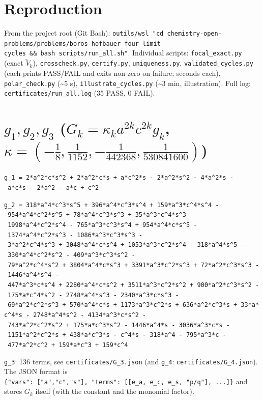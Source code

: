 \documentclass[11pt,a4paper]{report}
\begin{document}
\section{Reproduction}

From the project root (Git Bash): \texttt{outils/wsl\ "cd\ chemistry-open-problems/problems/boros-hofbauer-four-limit-cycles\ \&\&\ bash\ scripts/run\_all.sh"}.
Individual scripts: \texttt{focal\_exact.py} (exact \(\tilde V_k\)), \texttt{crosscheck.py}, \texttt{certify.py}, \texttt{uniqueness.py},
\texttt{validated\_cycles.py} (each prints PASS/FAIL and exits non-zero on failure; seconds each), \texttt{polar\_check.py}
(\textasciitilde5 s), \texttt{illustrate\_cycles.py} (\textasciitilde3 min, illustration). Full log: \texttt{certificates/run\_all.log} (35 PASS, 0 FAIL).

\section{\texorpdfstring{\(g_1,g_2,g_3\) (\(G_k=\kappa_k a^{2k}c^{2k}g_k\), \(\kappa=(-\frac18,\frac1{1152},-\frac1{442368},\frac1{530841600})\))}{g\_1,g\_2,g\_3 (G\_k=\textbackslash kappa\_k a\^{}\{2k\}c\^{}\{2k\}g\_k, \textbackslash kappa=(-\textbackslash frac18,\textbackslash frac1\{1152\},-\textbackslash frac1\{442368\},\textbackslash frac1\{530841600\}))}}

\texttt{g\_1\ =\ 2*a\^{}2*c*s\^{}2\ +\ 2*a\^{}2*c*s\ +\ a*c\^{}2*s\ -\ 2*a\^{}2*s\^{}2\ -\ 4*a\^{}2*s\ -\ a*c*s\ -\ 2*a\^{}2\ -\ a*c\ +\ c\^{}2}

\texttt{g\_2\ =\ 318*a\^{}4*c\^{}3*s\^{}5\ +\ 396*a\^{}4*c\^{}3*s\^{}4\ +\ 159*a\^{}3*c\^{}4*s\^{}4\ -\ 954*a\^{}4*c\^{}2*s\^{}5\ +\ 78*a\^{}4*c\^{}3*s\^{}3\ +\ 35*a\^{}3*c\^{}4*s\^{}3\ -\ 1998*a\^{}4*c\^{}2*s\^{}4\ -\ 765*a\^{}3*c\^{}3*s\^{}4\ +\ 954*a\^{}4*c*s\^{}5\ -\ 1374*a\^{}4*c\^{}2*s\^{}3\ -\ 1086*a\^{}3*c\^{}3*s\^{}3\ -\ 3*a\^{}2*c\^{}4*s\^{}3\ +\ 3048*a\^{}4*c*s\^{}4\ +\ 1053*a\^{}3*c\^{}2*s\^{}4\ -\ 318*a\^{}4*s\^{}5\ -\ 330*a\^{}4*c\^{}2*s\^{}2\ -\ 409*a\^{}3*c\^{}3*s\^{}2\ -\ 79*a\^{}2*c\^{}4*s\^{}2\ +\ 3804*a\^{}4*c*s\^{}3\ +\ 3391*a\^{}3*c\^{}2*s\^{}3\ +\ 72*a\^{}2*c\^{}3*s\^{}3\ -\ 1446*a\^{}4*s\^{}4\ -\ 447*a\^{}3*c*s\^{}4\ +\ 2280*a\^{}4*c*s\^{}2\ +\ 3511*a\^{}3*c\^{}2*s\^{}2\ +\ 900*a\^{}2*c\^{}3*s\^{}2\ -\ 175*a*c\^{}4*s\^{}2\ -\ 2748*a\^{}4*s\^{}3\ -\ 2340*a\^{}3*c*s\^{}3\ -\ 69*a\^{}2*c\^{}2*s\^{}3\ +\ 570*a\^{}4*c*s\ +\ 1173*a\^{}3*c\^{}2*s\ +\ 636*a\^{}2*c\^{}3*s\ +\ 33*a*c\^{}4*s\ -\ 2748*a\^{}4*s\^{}2\ -\ 4134*a\^{}3*c*s\^{}2\ -\ 743*a\^{}2*c\^{}2*s\^{}2\ +\ 175*a*c\^{}3*s\^{}2\ -\ 1446*a\^{}4*s\ -\ 3036*a\^{}3*c*s\ -\ 1151*a\^{}2*c\^{}2*s\ +\ 438*a*c\^{}3*s\ -\ c\^{}4*s\ -\ 318*a\^{}4\ -\ 795*a\^{}3*c\ -\ 477*a\^{}2*c\^{}2\ +\ 159*a*c\^{}3\ +\ 159*c\^{}4}

\texttt{g\_3}: 136 terms, see \texttt{certificates/G\_3.json} (and \texttt{g\_4}: \texttt{certificates/G\_4.json}). The JSON format is
\texttt{\{"vars":\ {[}"a","c","s"{]},\ "terms":\ {[}{[}e\_a,\ e\_c,\ e\_s,\ "p/q"{]},\ ...{]}\}} and stores \(G_k\) itself (with the constant
and the monomial factor).
\end{document}
